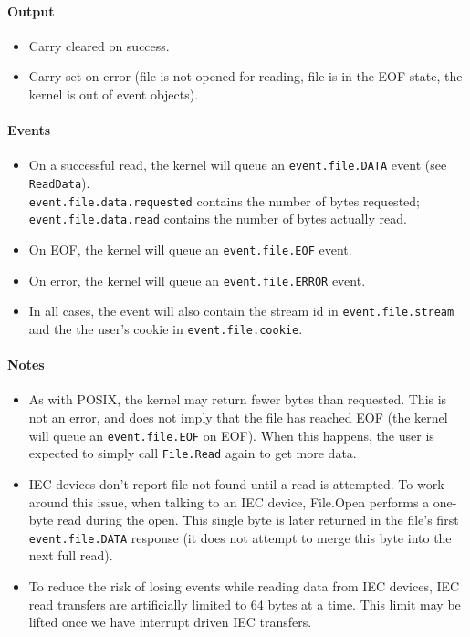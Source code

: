 \paragraph{Output}
\begin{itemize}
\item Carry cleared on success.
\item Carry set on error (file is not opened for reading, file is in the EOF state, the kernel is out of event objects).
\end{itemize}

\paragraph{Events}
\begin{itemize}
\item On a successful read, the kernel will queue an \verb+event.file.DATA+ event (see \verb+ReadData+). \\ \verb+event.file.data.requested+ contains the number of bytes requested;  \verb+event.file.data.read+ contains the number of bytes actually read.
\item On EOF, the kernel will queue an \verb+event.file.EOF+ event.
\item On error, the kernel will queue an \verb+event.file.ERROR+ event.
\item In all cases, the event will also contain the stream id in \verb+event.file.stream+ and the the user's cookie in \verb+event.file.cookie+.
\end{itemize}

\paragraph{Notes}
\begin{itemize}
\item As with POSIX, the kernel may return fewer bytes than requested.  This is not an error, and does not imply that the file has reached EOF (the kernel will queue an \verb+event.file.EOF+ on EOF).  When this happens, the user is expected to simply call \verb+File.Read+ again to get more data.

\item IEC devices don't report file-not-found until a read is attempted.  To work around this issue, when talking to an IEC device, File.Open performs a one-byte read during the open.  This single byte is later returned in the file's first \verb+event.file.DATA+ response (it does not attempt to merge this byte into the next full read).  

\item To reduce the risk of losing events while reading data from IEC devices, IEC read transfers are artificially limited to 64 bytes at a time.  This limit may be lifted once we have interrupt driven IEC transfers.
\end{itemize}

